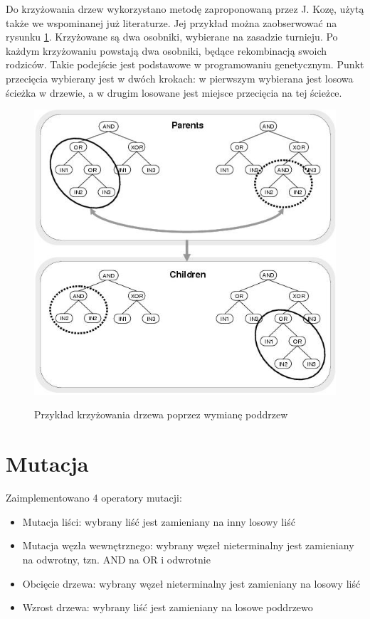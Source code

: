 \documentclass[twoside]{iisthesis}
\begin{document}
Do krzyżowania drzew wykorzystano metodę zaproponowaną przez J. Kozę, użytą także we wspominanej już literaturze. Jej przykład można zaobserwować na rysunku \ref{fig:cross}. Krzyżowane są dwa osobniki, wybierane na zasadzie turnieju. Po każdym krzyżowaniu powstają dwa osobniki, będące rekombinacją swoich rodziców. Takie podejście jest podstawowe w programowaniu genetycznym. Punkt przecięcia wybierany jest w dwóch krokach: w pierwszym wybierana jest losowa ścieżka w drzewie, a w drugim losowane jest miejsce przecięcia na tej ścieżce. 

\begin{figure}[h]
\center
\caption {Przykład krzyżowania drzewa poprzez wymianę poddrzew \cite{egp}}
\includegraphics[scale = 0.7]{subtree_co.jpg}
\label{fig:cross}
\end{figure}

\section {Mutacja}

Zaimplementowano 4 operatory mutacji:

\begin{itemize}
	\item Mutacja liści: wybrany liść jest zamieniany na inny losowy liść
	\item Mutacja węzła wewnętrznego: wybrany węzeł nieterminalny jest zamieniany na odwrotny, tzn. AND na OR i odwrotnie 
	\item Obcięcie drzewa: wybrany węzeł nieterminalny jest zamieniany na losowy liść
	\item Wzrost drzewa: wybrany liść jest zamieniany na losowe poddrzewo
\end{itemize}
\end{document}

